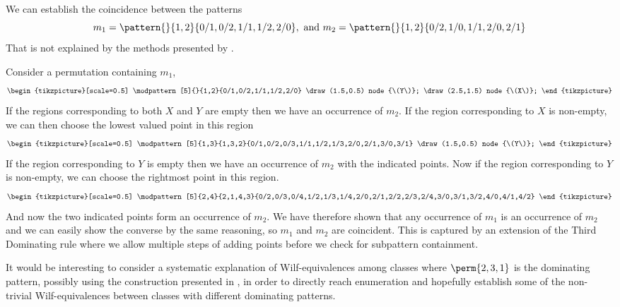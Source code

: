  \begin{example}
   We can establish the coincidence between the patterns
   \begin{equation*}
     m_1 = \pattern{}{1,2}{0/1,0/2,1/1,1/2,2/0}, \text{ and } m_2 = \pattern{}{1,2}{0/2,1/0,1/1,2/0,2/1}
   \end{equation*}
   That is not explained by the methods presented by \textcite{DBLP:journals/corr/ClaessonTU14}.

   Consider a permutation containing \(m_1\),
   \begin{equation*}
     \begin{tikzpicture}[scale=0.5]
         \modpattern[5]{}{1,2}{0/1,0/2,1/1,1/2,2/0}
         \draw (1.5,0.5) node {\(Y\)};
         \draw (2.5,1.5) node {\(X\)};
     \end{tikzpicture}
   \end{equation*}
   If the regions corresponding to both \(X\) and \(Y\) are empty then we have
   an occurrence of \(m_2\).
   If the region corresponding to \(X\) is non-empty, we can then choose
   the lowest valued point in this region
   \begin{equation*}
     \begin{tikzpicture}[scale=0.5]
         \modpattern[5]{1,3}{1,3,2}{0/1,0/2,0/3,1/1,1/2,1/3,2/0,2/1,3/0,3/1}
         \draw (1.5,0.5) node {\(Y\)};
     \end{tikzpicture}
   \end{equation*}
   If the region corresponding to \(Y\) is empty then we have an occurrence of
   \(m_2\) with the indicated points.
   Now if the region corresponding to \(Y\) is non-empty, we can choose the
   rightmost point in this region.
   \begin{equation*}
     \begin{tikzpicture}[scale=0.5]
         \modpattern[5]{2,4}{2,1,4,3}{0/2,0/3,0/4,1/2,1/3,1/4,2/0,2/1,2/2,2/3,2/4,3/0,3/1,3/2,4/0,4/1,4/2}
     \end{tikzpicture}
   \end{equation*}
   And now the two indicated points form an occurrence of \(m_2\).
   We have therefore shown that any occurrence of \(m_1\) is an occurrence of
   \(m_2\) and we can easily show the converse by the same reasoning, so \(m_1\)
   and \(m_2\) are coincident.
   This is captured by an extension of the Third Dominating rule where we allow
   multiple steps of adding points before we check for subpattern containment.
 \end{example}

It would be interesting to consider a systematic explanation of Wilf-equivalences among classes
where \(\perm{2,3,1}\) is the dominating pattern, possibly using the  construction presented in
\cite[Sec.~12]{2015arXiv151203226B}, in order to directly reach enumeration and hopefully establish
some of the non-trivial Wilf-equivalences between classes with different dominating patterns.
